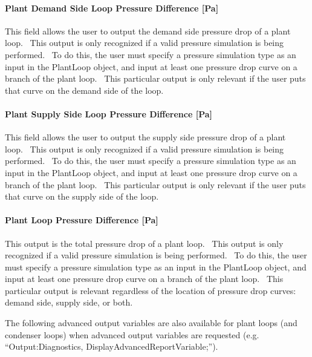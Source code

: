 \paragraph{Plant Demand Side Loop Pressure Difference {[}Pa{]}}\label{plant-demand-side-loop-pressure-difference-pa}

This field allows the user to output the demand side pressure drop of a plant loop.~ This output is only recognized if a valid pressure simulation is being performed.~ To do this, the user must specify a pressure simulation type as an input in the PlantLoop object, and input at least one pressure drop curve on a branch of the plant loop.~ This particular output is only relevant if the user puts that curve on the demand side of the loop.

\paragraph{Plant Supply Side Loop Pressure Difference {[}Pa{]}}\label{plant-supply-side-loop-pressure-difference-pa}

This field allows the user to output the supply side pressure drop of a plant loop.~ This output is only recognized if a valid pressure simulation is being performed.~ To do this, the user must specify a pressure simulation type as an input in the PlantLoop object, and input at least one pressure drop curve on a branch of the plant loop.~ This particular output is only relevant if the user puts that curve on the supply side of the loop.

\paragraph{Plant Loop Pressure Difference {[}Pa{]}}\label{plant-loop-pressure-difference-pa}

This output is the total pressure drop of a plant loop.~ This output is only recognized if a valid pressure simulation is being performed.~ To do this, the user must specify a pressure simulation type as an input in the PlantLoop object, and input at least one pressure drop curve on a branch of the plant loop.~ This particular output is relevant regardless of the location of pressure drop curves: demand side, supply side, or both.

The following advanced output variables are also available for plant loops (and condenser loops) when advanced output variables are requested (e.g. ``Output:Diagnostics, DisplayAdvancedReportVariable;'').

